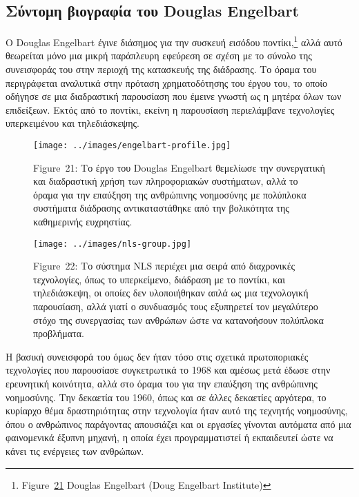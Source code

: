 \documentclass[
]{article}
\begin{document}
\hypertarget{ux3c3ux3cdux3bdux3c4ux3bfux3bcux3b7-ux3b2ux3b9ux3bfux3b3ux3c1ux3b1ux3c6ux3afux3b1-ux3c4ux3bfux3c5-douglas-engelbart}{%
\subsection{Σύντομη βιογραφία του Douglas
Engelbart}\label{ux3c3ux3cdux3bdux3c4ux3bfux3bcux3b7-ux3b2ux3b9ux3bfux3b3ux3c1ux3b1ux3c6ux3afux3b1-ux3c4ux3bfux3c5-douglas-engelbart}}

O Douglas Engelbart έγινε διάσημος για την συσκευή εισόδου
ποντίκι,\footnote{Figure~\protect\hyperlink{fig:engelbart-profile}{21}
  Douglas Engelbart (Doug Engelbart Institute)} αλλά αυτό θεωρείται μόνο
μια μικρή παράπλευρη εφεύρεση σε σχέση με το σύνολο της συνεισφοράς του
στην περιοχή της κατασκευής της διάδρασης. Το όραμα του περιγράφεται
αναλυτικά στην πρόταση χρηματοδότησης του έργου του, το οποίο οδήγησε σε
μια διαδραστική παρουσίαση που έμεινε γνωστή ως η μητέρα όλων των
επιδείξεων. Εκτός από το ποντίκι, εκείνη η παρουσίαση περιελάμβανε
τεχνολογίες υπερκειμένου και τηλεδιάσκεψης.

\leavevmode{}%
\begin{figure}
\hypertarget{fig:engelbart-profile}{%
\centering
\texttt{[image: ../images/engelbart-profile.jpg]}
\caption{Figure~21: Το έργο του Douglas Engelbart θεμελίωσε την
συνεργατική και διαδραστική χρήση των πληροφοριακών συστήματων, αλλά το
όραμα για την επαύξηση της ανθρώπινης νοημοσύνης με πολύπλοκα συστήματα
διάδρασης αντικαταστάθηκε από την βολικότητα της καθημερινής
ευχρηστίας.}\label{fig:engelbart-profile}
}
\end{figure}

\leavevmode{}%
\begin{figure}
\hypertarget{fig:nls-group}{%
\centering
\texttt{[image: ../images/nls-group.jpg]}
\caption{Figure~22: Το σύστημα NLS περιέχει μια σειρά από διαχρονικές
τεχνολογίες, όπως το υπερκείμενο, διάδραση με το ποντίκι, και
τηλεδιάσκεψη, οι οποίες δεν υλοποιήθηκαν απλά ως μια τεχνολογική
παρουσίαση, αλλά γιατί ο συνδυασμός τους εξυπηρετεί τον μεγαλύτερο στόχο
της συνεργασίας των ανθρώπων ώστε να κατανοήσουν πολύπλοκα
προβλήματα.}\label{fig:nls-group}
}
\end{figure}

Η βασική συνεισφορά του όμως δεν ήταν τόσο στις σχετικά πρωτοποριακές
τεχνολογίες που παρουσίασε συγκετρωτικά το 1968 και αμέσως μετά έδωσε
στην ερευνητική κοινότητα, αλλά στο όραμα του για την επαύξηση της
ανθρώπινης νοημοσύνης. Την δεκαετία του 1960, όπως και σε άλλες
δεκαετίες αργότερα, το κυρίαρχο θέμα δραστηριότητας στην τεχνολογία ήταν
αυτό της τεχνητής νοημοσύνης, όπου ο ανθρώπινος παράγοντας απουσιάζει
και οι εργασίες γίνονται αυτόματα από μια φαινομενικά έξυπνη μηχανή, η
οποία έχει προγραμματιστεί ή εκπαιδευτεί ώστε να κάνει τις ενέργειες των
ανθρώπων.
\end{document}
